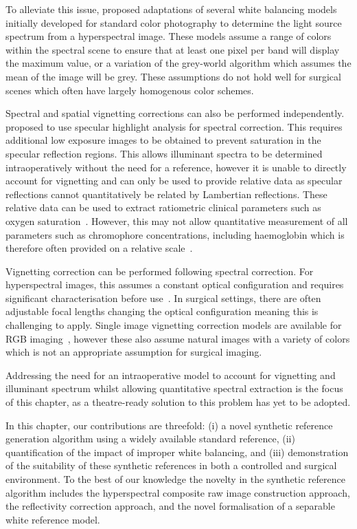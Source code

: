 %
To alleviate this issue, \citet{Khan2017} proposed adaptations of several white balancing models initially developed for standard color photography to determine the light source spectrum from a hyperspectral image.
These models assume a range of colors within the spectral scene to ensure that at least one pixel per band will display the maximum value, or a variation of the grey-world algorithm which assumes the mean of the image will be grey.
These assumptions do not hold well for surgical scenes which often have largely homogenous color schemes.

Spectral and spatial vignetting corrections can also be performed independently. \citet{Ayala2020} proposed to use
specular highlight analysis for spectral correction.
This requires additional low exposure images to be obtained to prevent saturation in the specular reflection regions.
This allows illuminant spectra to be determined intraoperatively without the need for a reference, however it is unable to directly account for vignetting and can only be used to provide relative data as specular reflections cannot quantitatively be related by Lambertian reflections.
%
These relative data can be used to extract ratiometric clinical parameters such as oxygen saturation~\citep{Giannoni2018,MacKenzie2018}.
However, this may not allow quantitative measurement of all parameters such as chromophore concentrations, including haemoglobin which is therefore often provided on a relative scale~\citep{Kulcke2018}.

Vignetting correction can be performed following spectral correction. For hyperspectral images, this assumes a constant optical configuration and requires significant characterisation before use~\citep{Jiang2019}. In surgical settings, there are often adjustable focal lengths changing the optical configuration meaning this is challenging to apply. Single image vignetting correction models are available for RGB imaging~\citep{Cho2014}, however these also assume natural images with a variety of colors which is not an appropriate assumption for surgical imaging.

Addressing the need for an intraoperative model to account for vignetting and illuminant spectrum whilst allowing quantitative spectral extraction is the focus of this chapter, as a theatre-ready solution to this problem has yet to be adopted. 

In this chapter, our contributions are threefold: (i) a novel synthetic reference generation algorithm using a widely available standard reference, (ii) quantification of the impact of improper white balancing, and (iii) demonstration of the suitability of these synthetic references in both a controlled and surgical environment. To the best of our knowledge the novelty in the synthetic reference algorithm includes the hyperspectral composite raw image construction approach, the reflectivity correction approach, and the novel formalisation of a separable white reference model. 

